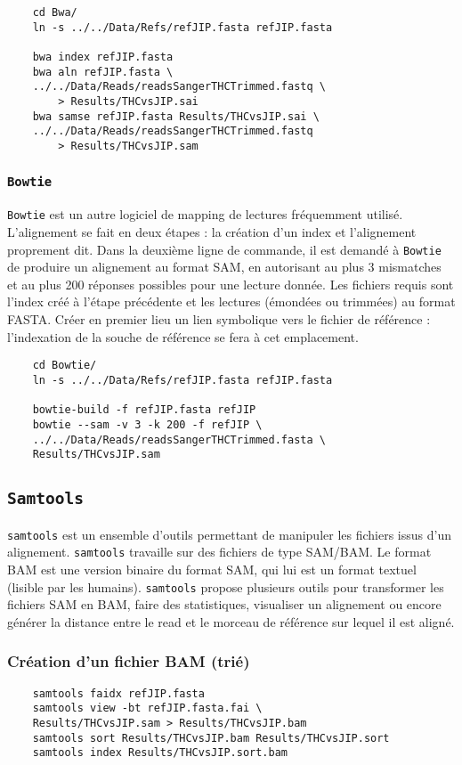 \documentclass[a4paper,12pt]{article}
\begin{document}
\begin{lstlisting}
	cd Bwa/
	ln -s ../../Data/Refs/refJIP.fasta refJIP.fasta
	
	bwa index refJIP.fasta
	bwa aln refJIP.fasta \
	../../Data/Reads/readsSangerTHCTrimmed.fastq \
		> Results/THCvsJIP.sai
	bwa samse refJIP.fasta Results/THCvsJIP.sai \
	../../Data/Reads/readsSangerTHCTrimmed.fastq 
		> Results/THCvsJIP.sam
\end{lstlisting}

\subsubsection{\tt{Bowtie}}
{\tt Bowtie} est un autre logiciel de mapping de lectures fréquemment utilisé. L'alignement se fait en deux étapes : la création d'un index et l'alignement proprement dit. Dans la deuxième ligne de commande, il est demandé à {\tt Bowtie} de produire un alignement au format SAM, en autorisant au plus 3 mismatches et au plus 200 réponses possibles pour une lecture donnée. Les fichiers requis sont l'index créé à l'étape précédente et les lectures (émondées ou trimmées) au format FASTA.
Créer en premier lieu un lien symbolique vers le fichier de référence : l'indexation de la souche de référence se fera à cet emplacement.

\begin{lstlisting}
	cd Bowtie/
	ln -s ../../Data/Refs/refJIP.fasta refJIP.fasta
	
	bowtie-build -f refJIP.fasta refJIP
	bowtie --sam -v 3 -k 200 -f refJIP \
	../../Data/Reads/readsSangerTHCTrimmed.fasta \
	Results/THCvsJIP.sam
\end{lstlisting}

\subsection{{\tt Samtools}}

{\tt samtools} est un ensemble d'outils permettant de manipuler les fichiers issus d'un alignement. {\tt samtools} travaille sur des fichiers de type SAM/BAM. Le format BAM est une version binaire du format SAM, qui lui est un format textuel (lisible par les humains). {\tt samtools} propose plusieurs outils pour transformer les fichiers SAM en BAM, faire des statistiques, visualiser un alignement ou encore générer la distance entre le read et le morceau de référence sur lequel il est aligné.

\subsubsection*{Création d'un fichier BAM (trié)}
\begin{lstlisting}
	samtools faidx refJIP.fasta
	samtools view -bt refJIP.fasta.fai \
	Results/THCvsJIP.sam > Results/THCvsJIP.bam
	samtools sort Results/THCvsJIP.bam Results/THCvsJIP.sort
	samtools index Results/THCvsJIP.sort.bam
\end{lstlisting}
\end{document}
